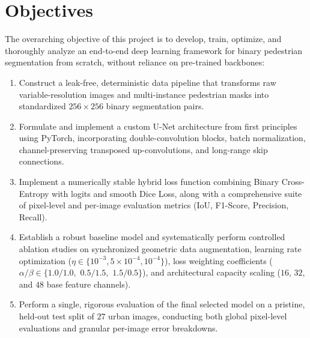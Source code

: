 \documentclass[10pt,a4paper]{report}
\begin{document}
\section{Objectives}
The overarching objective of this project is to develop, train, optimize, and thoroughly analyze an end-to-end deep learning framework for binary pedestrian segmentation from scratch, without reliance on pre-trained backbones:
\begin{enumerate}
    \item Construct a leak-free, deterministic data pipeline that transforms raw variable-resolution images and multi-instance pedestrian masks into standardized $256 \times 256$ binary segmentation pairs.
    \item Formulate and implement a custom U-Net architecture from first principles using PyTorch, incorporating double-convolution blocks, batch normalization, channel-preserving transposed up-convolutions, and long-range skip connections.
    \item Implement a numerically stable hybrid loss function combining Binary Cross-Entropy with logits and smooth Dice Loss, along with a comprehensive suite of pixel-level and per-image evaluation metrics (IoU, F1-Score, Precision, Recall).
    \item Establish a robust baseline model and systematically perform controlled ablation studies on synchronized geometric data augmentation, learning rate optimization ($\eta \in \{10^{-3}, 5\times 10^{-4}, 10^{-4}\}$), loss weighting coefficients ($\alpha / \beta \in \{1.0/1.0,$ $0.5/1.5,$ $1.5/0.5\}$), and architectural capacity scaling ($16$, $32$, and $48$ base feature channels).
    \item Perform a single, rigorous evaluation of the final selected model on a pristine, held-out test split of $27$ urban images, conducting both global pixel-level evaluations and granular per-image error breakdowns.
\end{enumerate}
\end{document}

